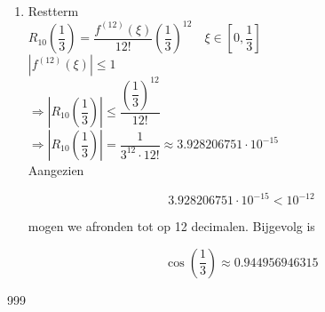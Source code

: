 \documentclass[a4paper]{article}
\begin{document}
\begin{enumerate}
Stel nu $x=\dfrac13$, dan hebben we dus

\begin{align*}
\cos\left(\dfrac13\right)
&=
1-\dfrac{\left(\dfrac13\right)^2}{2!}
+\dfrac{\left(\dfrac13\right)^4}{4!}
-\dfrac{\left(\dfrac13\right)^6}{6!}
+\dfrac{\left(\dfrac13\right)^8}{8!}
-\dfrac{\left(\dfrac13\right)^{10}}{10!}
+R_{10}\left(\dfrac13\right)
\\[2mm]
&\approx
0.944956946314085
+
R_{10}\left(\dfrac13\right)
\end{align*}

\item Restterm\\

$R_{10}\left(\dfrac13\right)
=
\dfrac{f^{(12)}(\xi)}{12!}\left(\dfrac13\right)^{12}
\quad \xi\in\left[0,\dfrac13\right]$\\

$\left|f^{(12)}(\xi)\right|\leq1$\\

$\Rightarrow
\left|R_{10}\left(\dfrac13\right)\right|
\leq
\dfrac{\left(\dfrac13\right)^{12}}{12!}$\\

$\Rightarrow
\left|R_{10}\left(\dfrac13\right)\right|
=
\dfrac{1}{3^{12}\cdot12!}
\approx
3.928206751\cdot10^{-15}$\\

Aangezien

\[
3.928206751\cdot10^{-15}<10^{-12}
\]

mogen we afronden tot op 12 decimalen. Bijgevolg is

\[
\cos\left(\dfrac13\right)\approx0.944956946315
\]

\end{enumerate}

\begin{thebibliography}{999}
\end{thebibliography}
\end{document}
